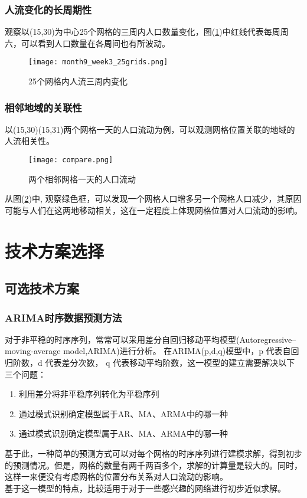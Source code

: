 \subsubsection*{人流变化的长周期性}
观察以(15,30)为中心25个网格的三周内人口数量变化，图(\ref{fig:2.3})中红线代表每周周六，可以看到人口数量在各周间也有所波动。
\begin{figure}[ht]
\centering
\texttt{[image: month9\_week3\_25grids.png]}
\caption{25个网格内人流三周内变化}
\label{fig:2.3}
\end{figure}
\subsubsection*{相邻地域的关联性}
以(15,30)(15,31)两个网格一天的人口流动为例，可以观测网格位置关联的地域的人流相关性。
\begin{figure}[ht]
\centering
\texttt{[image: compare.png]}
\caption{两个相邻网格一天的人口流动}
\label{fig:2.4}
\end{figure}
\indent 从图(\ref{fig:2.4})中,
观察绿色框，可以发现一个网格人口增多另一个网格人口减少，其原因可能与人们在这两地移动相关，这在一定程度上体现网格位置对人口流动的影响。
\section{技术方案选择}
\subsection{可选技术方案}
\subsubsection*{ARIMA时序数据预测方法}
对于非平稳的时序序列，常常可以采用差分自回归移动平均模型(Autoregressive–moving-average model,ARIMA)进行分析\cite{whittle1966prediction,Hannan1970Multiple}。
在ARIMA(p,d,q)模型中，p 代表自回归阶数，d 代表差分次数， q 代表移动平均阶数，这一模型的建立需要解决以下三个问题：
\begin{enumerate}
	\item 利用差分将非平稳序列转化为平稳序列
	\item 通过模式识别确定模型属于AR、MA、ARMA中的哪一种
	\item 通过模式识别确定模型属于AR、MA、ARMA中的哪一种
\end{enumerate}
\indent 基于此，一种简单的预测方式可以对每个网格的时序序列进行建模求解，得到初步的预测情况。但是，网格的数量有两千两百多个，求解的计算量是较大的。同时，这样一来便没有考虑网格的位置分布关系对人口流动的影响。\\
\indent 基于这一模型的特点，比较适用于对于一些感兴趣的网络进行初步近似求解。
